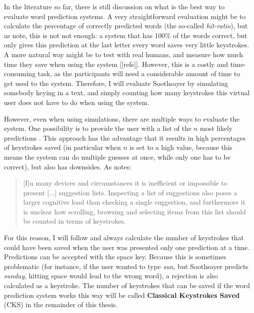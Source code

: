 \documentclass[12pt]{article}
\begin{document}
In the literature so far, there is still discussion on what is the best way to evaluate word prediction systems. A very straightforward evaluation might be to calculate the percentage of correctly predicted words (the so-called \emph{hit-ratio}), but as  note, this is not not enough: a system that has 100\% of the words correct, but only gives this prediction at the last letter every word saves very little keystrokes. A more natural way might be to test with real humans, and measure how much time they save when using the system [[refs]]. However, this is a costly and time-consuming task, as the participants will need a considerable amount of time to get used to the system. Therefore, I will evaluate Soothsayer by simulating somebody keying in a text, and simply counting how many keystrokes this virtual user does not have to do when using the system. 


However, even when using simulations, there are multiple ways to evaluate the system. One possibility is to provide the user with a list of the $n$ most likely predictions \cite{Lesher+99,Fazly+03}. This approach has the advantage that it results in high percentages of keystrokes saved (in particular when $n$ is set to a high value, because this means the system can do multiple guesses at once, while only one has to be correct), but also has downsides. As  notes: 

\begin{quotation}
[I]n many devices and circumstances it is inefficient or impossible to present [...] suggestion lists. Inspecting a list of suggestions also poses a larger cognitive load than checking a single suggestion, and furthermore it is unclear how scrolling, browsing and selecting items from this list should be counted in terms of keystrokes.
\end{quotation}

For this reason, I will follow  and always calculate the number of keystrokes that could have been saved when the user was presented only one prediction at a time. Predictions can be accepted with the space key. Because this is sometimes problematic (for instance, if the user wanted to type \emph{sun}, but Soothsayer predicts \emph{sunday}, hitting space would lead to the wrong word), a rejection is also calculated as a keystroke. The number of keystrokes that can be saved if the word prediction system works this way will be called \textbf{Classical Keystrokes Saved} (CKS) in the remainder of this thesis.
\end{document}

